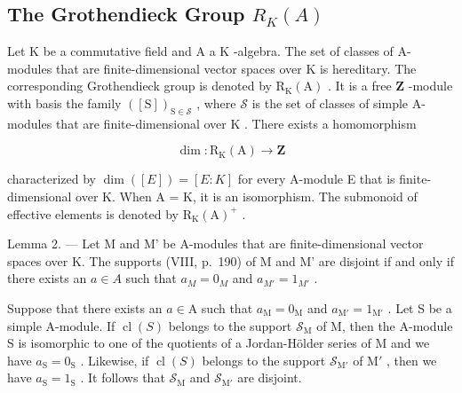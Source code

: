 \subsection{\texorpdfstring{The Grothendieck Group \(R_{K}(A)\)}{The Grothendieck Group R\_\{K\}(A)}}

Let \(\mathrm{K}\) be a commutative field and \(\mathrm{A}\) a \(\mathrm{K}\) -algebra. The set of classes of A-modules that are finite-dimensional vector spaces over \(\mathrm{K}\) is hereditary. The corresponding Grothendieck group is denoted by \(\mathrm{R}_{\mathrm{K}}(\mathrm{A})\) . It is a free \(\mathbf{Z}\) -module with basis the family \(([\mathrm{S}])_{\mathrm{S}\in \mathcal{S}}\) , where \(\mathcal{S}\) is the set of classes of simple A-modules that are finite-dimensional over \(\mathrm{K}\) . There exists a homomorphism

\[
\dim : \mathrm{R} _ {\mathrm{K}} (\mathrm{A}) \longrightarrow \mathbf {Z}
\]

characterized by \(\dim([E]) = [E : K]\) for every A-module E that is finite-dimensional over K. When A = K, it is an isomorphism. The submonoid of effective elements is denoted by \(\mathrm{R}_{\mathrm{K}}(\mathrm{A})^{+}\) .

Lemma 2. --- Let M and M' be A-modules that are finite-dimensional vector spaces over K. The supports (VIII, p.~190) of M and M' are disjoint if and only if there exists an \(a \in A\) such that \(a_{M} = 0_{M}\) and \(a_{M'} = 1_{M'}\) .

Suppose that there exists an \(a \in \mathrm{A}\) such that \(a_{\mathrm{M}} = 0_{\mathrm{M}}\) and \(a_{\mathrm{M}'} = 1_{\mathrm{M}'}\) . Let S be a simple A-module. If \(\operatorname{cl}(S)\) belongs to the support \(\mathcal{S}_{\mathrm{M}}\) of M, then the A-module S is isomorphic to one of the quotients of a Jordan-Hölder series of M and we have \(a_{\mathrm{S}} = 0_{\mathrm{S}}\) . Likewise, if \(\operatorname{cl}(S)\) belongs to the support \(\mathcal{S}_{\mathrm{M}'}\) of \(\mathrm{M}'\) , then we have \(a_{\mathrm{S}} = 1_{\mathrm{S}}\) . It follows that \(\mathcal{S}_{\mathrm{M}}\) and \(\mathcal{S}_{\mathrm{M}'}\) are disjoint.

